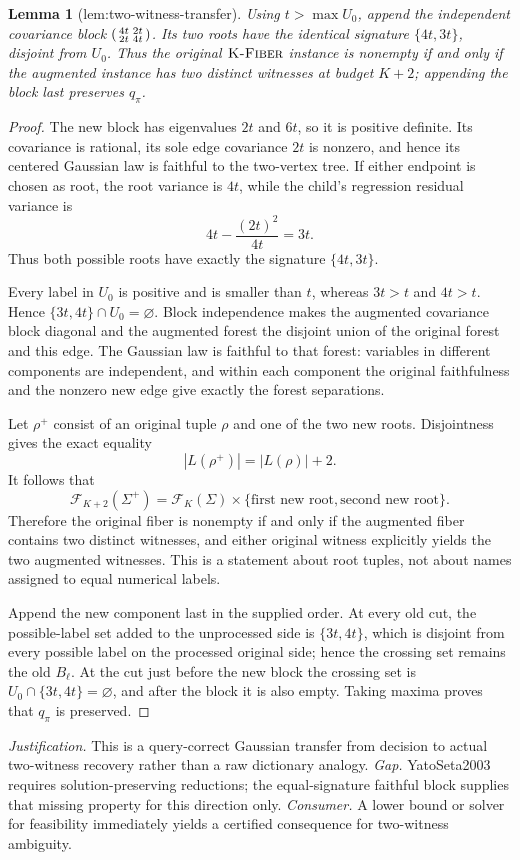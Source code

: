 \documentclass{article}
\newtheorem{lemma}{Lemma}
\begin{document}
\begin{lemma}[lem:two-witness-transfer]\label{lem:two-witness-transfer}
Using \(t>\max U_0\), append the independent covariance block \(\begin{psmallmatrix}4t&2t\\2t&4t\end{psmallmatrix}\). Its two roots have the identical signature \(\{4t,3t\}\), disjoint from \(U_0\). Thus the original \(\textsc{K-Fiber}\) instance is nonempty if and only if the augmented instance has two distinct witnesses at budget \(K+2\); appending the block last preserves \(q_\pi\).
\end{lemma}
\begin{proof}
The new block has eigenvalues \(2t\) and \(6t\), so it is positive definite.  Its covariance is rational, its sole edge covariance \(2t\) is nonzero, and hence its centered Gaussian law is faithful to the two-vertex tree.  If either endpoint is chosen as root, the root variance is \(4t\), while the child's regression residual variance is
\[
 4t-\frac{(2t)^2}{4t}=3t.
\]
Thus both possible roots have exactly the signature \(\{4t,3t\}\).

Every label in \(U_0\) is positive and is smaller than \(t\), whereas \(3t>t\) and \(4t>t\).  Hence \(\{3t,4t\}\cap U_0=\varnothing\).  Block independence makes the augmented covariance block diagonal and the augmented forest the disjoint union of the original forest and this edge.  The Gaussian law is faithful to that forest: variables in different components are independent, and within each component the original faithfulness and the nonzero new edge give exactly the forest separations.

Let \(\rho^+\) consist of an original tuple \(\rho\) and one of the two new roots.  Disjointness gives the exact equality
\[
 |L(\rho^+)|=|L(\rho)|+2.
\]
It follows that
\[
 \mathcal F_{K+2}(\Sigma^+)
 =\mathcal F_K(\Sigma)\times\{\text{first new root},\text{second new root}\}.
\]
Therefore the original fiber is nonempty if and only if the augmented fiber contains two distinct witnesses, and either original witness explicitly yields the two augmented witnesses.  This is a statement about root tuples, not about names assigned to equal numerical labels.

Append the new component last in the supplied order.  At every old cut, the possible-label set added to the unprocessed side is \(\{3t,4t\}\), which is disjoint from every possible label on the processed original side; hence the crossing set remains the old \(B_\ell\).  At the cut just before the new block the crossing set is \(U_0\cap\{3t,4t\}=\varnothing\), and after the block it is also empty.  Taking maxima proves that \(q_\pi\) is preserved.
\end{proof}
\par\smallskip\noindent \textit{Justification.} This is a query-correct Gaussian transfer from decision to actual two-witness recovery rather than a raw dictionary analogy. \textit{Gap.} YatoSeta2003 requires solution-preserving reductions; the equal-signature faithful block supplies that missing property for this direction only. \textit{Consumer.} A lower bound or solver for feasibility immediately yields a certified consequence for two-witness ambiguity.
\end{document}
